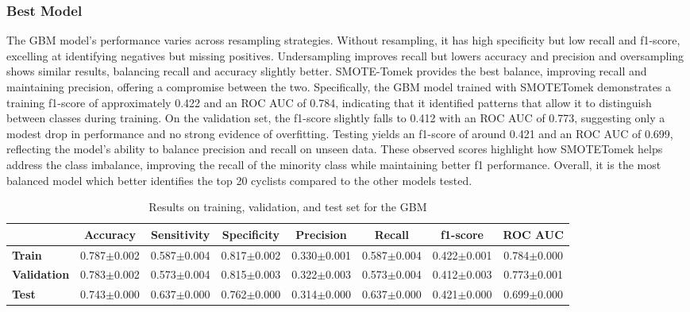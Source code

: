 \subsubsection{Best Model}
\label{subsubsec:best_model}
The GBM model's performance varies across resampling strategies. Without resampling, it has high specificity but low recall and f1-score, excelling at identifying negatives but missing positives. Undersampling improves recall but lowers accuracy and precision and oversampling shows similar results, balancing recall and accuracy slightly better. SMOTE-Tomek provides the best balance, improving recall and maintaining precision, offering a compromise between the two. Specifically, the GBM model trained with SMOTETomek demonstrates a training f1-score of approximately 0.422 and an ROC AUC of 0.784, indicating that it identified patterns that allow it to distinguish between classes during training. On the validation set, the f1-score slightly falls to 0.412 with an ROC AUC of 0.773, suggesting only a modest drop in performance and no strong evidence of overfitting. Testing yields an f1-score of around 0.421 and an ROC AUC of 0.699, reflecting the model’s ability to balance precision and recall on unseen data. These observed scores highlight how SMOTETomek helps address the class imbalance, improving the recall of the minority class while maintaining better f1 performance. Overall, it is the most balanced model which better identifies the top 20 cyclists compared to the other models tested.

\begin{table}[H]
    \centering
    \scriptsize
    \begin{tabular}{p{2.2cm}ccccccc}
    \toprule
    & \textbf{Accuracy} & \textbf{Sensitivity} & \textbf{Specificity} & \textbf{Precision} & \textbf{Recall} & \textbf{f1-score} & \textbf{ROC AUC} \\
    \midrule
    \textbf{Train} 
      & 0.787$\pm$0.002 
      & 0.587$\pm$0.004 
      & 0.817$\pm$0.002 
      & 0.330$\pm$0.001 
      & 0.587$\pm$0.004 
      & 0.422$\pm$0.001 
      & 0.784$\pm$0.000 \\
    \textbf{Validation}
      & 0.783$\pm$0.002 
      & 0.573$\pm$0.004 
      & 0.815$\pm$0.003 
      & 0.322$\pm$0.003 
      & 0.573$\pm$0.004 
      & 0.412$\pm$0.003 
      & 0.773$\pm$0.001 \\
    \textbf{Test}
      & 0.743$\pm$0.000 
      & 0.637$\pm$0.000 
      & 0.762$\pm$0.000 
      & 0.314$\pm$0.000 
      & 0.637$\pm$0.000 
      & 0.421$\pm$0.000 
      & 0.699$\pm$0.000 \\
    \bottomrule
    \end{tabular}
    \caption{\small Results on training, validation, and test set for the GBM}
\end{table}

